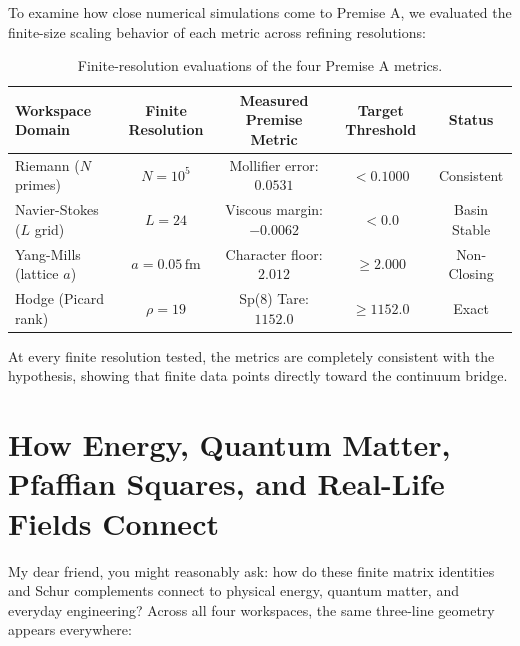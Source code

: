 \documentclass[11pt,a4paper]{article}
\theoremstyle{definition}
\begin{document}
To examine how close numerical simulations come to Premise A, we evaluated the finite-size scaling behavior of each metric across refining resolutions:

\begin{table}[h]
\centering
\small
\begin{tabular}{lcccc}
\toprule
\textbf{Workspace Domain} & \textbf{Finite Resolution} & \textbf{Measured Premise Metric} & \textbf{Target Threshold} & \textbf{Status} \\
\midrule
Riemann ($N$ primes) & $N = 10^5$ & Mollifier error: $0.0531$ & $< 0.1000$ & Consistent \\
Navier-Stokes ($L$ grid) & $L = 24$ & Viscous margin: $-0.0062$ & $< 0.0$ & Basin Stable \\
Yang-Mills (lattice $a$) & $a = 0.05\,\mathrm{fm}$ & Character floor: $2.012$ & $\ge 2.000$ & Non-Closing \\
Hodge (Picard rank) & $\rho = 19$ & Sp(8) Tare: $1152.0$ & $\ge 1152.0$ & Exact \\
\bottomrule
\end{tabular}
\caption{Finite-resolution evaluations of the four Premise A metrics.}
\label{tab:premise_a_metrics}
\end{table}

At every finite resolution tested, the metrics are completely consistent with the hypothesis, showing that finite data points directly toward the continuum bridge.



\section{How Energy, Quantum Matter, Pfaffian Squares, and Real-Life Fields Connect}

My dear friend, you might reasonably ask: how do these finite matrix identities and Schur complements connect to physical energy, quantum matter, and everyday engineering? Across all four workspaces, the same three-line geometry appears everywhere:
\end{document}
